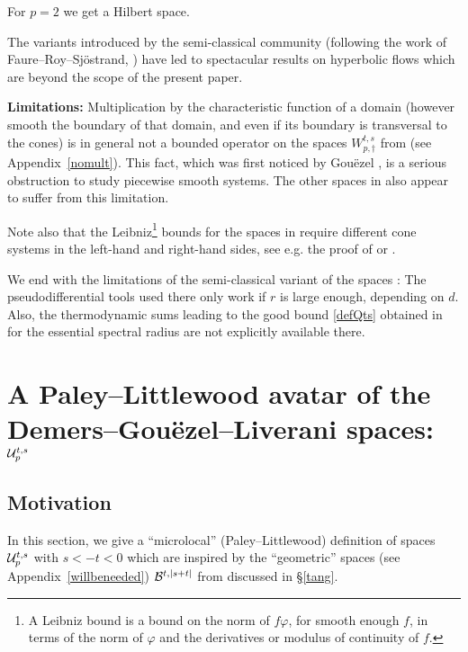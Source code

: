 \documentclass[10pt,twoside]{amsart}
\begin{document}
For $p=2$ we get a Hilbert space.

The variants introduced by the semi-classical community 
(following the work of Faure--Roy--Sj\"ostrand, \cite{FRS,FaTs1})
have led to spectacular results
on hyperbolic flows which are beyond the scope of the present paper.


\smallskip

{\bf Limitations:}
Multiplication by the characteristic function
of a domain (however smooth the boundary of that domain, and even if its
boundary is transversal to the cones) is in general not a bounded operator on the spaces 
$W^{t,s}_{p,\dagger}$ from \cite{BT1} (see Appendix~\ref{nomult}). This fact, which was first noticed
by Gou\"ezel \cite{Go0}, is
a serious obstruction  to study piecewise smooth systems.  The other
 spaces in \cite{BT1,BT2,FRS} also appear to suffer from this limitation.

Note also that the Leibniz\footnote{A Leibniz bound is a bound on the
norm of $f \varphi$, for smooth enough $f$, in terms of the norm of
$\varphi$ and the derivatives or modulus of continuity of $f$.} bounds for the spaces  in \cite{BT1, BT2}
 require  different cone systems in the left-hand and
right-hand sides, see e.g. the proof of \cite[Prop. 7.2]{BT1} or \cite{Ba}.

We end with the limitations of the semi-classical variant of the
spaces \cite{FRS}: The  pseudodifferential tools used there only
work if $r$ is large enough, depending on $d$. Also, the thermodynamic sums leading
to the good bound \eqref{defQts}  obtained in \cite{BT2} for the essential spectral
radius are not explicitly available  there.
  

\section{A Paley--Littlewood avatar of the Demers--Gou\"ezel--Liverani spaces: $\mathcal{U}^{t,s}_p$}
\label{SOBS}

\subsection{Motivation}
\label{motivv}

In this section, we give a ``microlocal'' (Paley--Littlewood) definition  of  spaces $\mathcal{U}^{t,s}_p$  with $s<-t<0$
which are inspired by the  ``geometric'' spaces (see Appendix~\ref{willbeneeded})
$\mathcal{B}^{t,|s+t|}$  from \cite{GL1} discussed in \S\ref{tang}.
\end{document}
